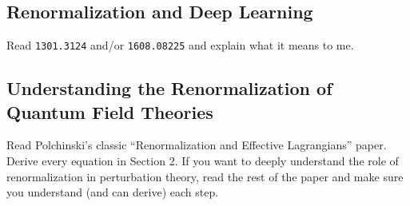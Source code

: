 \documentclass[12pt]{article}
\numberwithin{equation}{subsection}    %
\begin{document}
\subsection{Renormalization and Deep Learning}

Read \texttt{1301.3124} and/or \texttt{1608.08225} and explain what it means to me.

\subsection{Understanding the Renormalization of Quantum Field Theories}

Read Polchinski's classic ``Renormalization and Effective Lagrangians'' paper. Derive every equation in Section 2. If you want to deeply understand the role of renormalization in perturbation theory, read the rest of the paper and make sure you understand (and can derive) each step.
\end{document}
